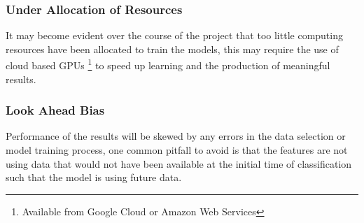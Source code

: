 \documentclass[11pt, a4paper]{article}
\begin{document}
\subsubsection{Under Allocation of Resources}
It may become evident over the course of the project that too little computing resources have been allocated to train the models, this may require the use of cloud based GPUs \footnote{Available from Google Cloud or Amazon Web Services} to speed up learning and the production of meaningful results. 
\subsubsection{Look Ahead Bias}
Performance of the results will be skewed by any errors in the data selection or model training process, one common pitfall to avoid is that the features are not using data that would not have been available at the initial time of classification such that the model is using future data.


{}
\clearpage
\end{document}
